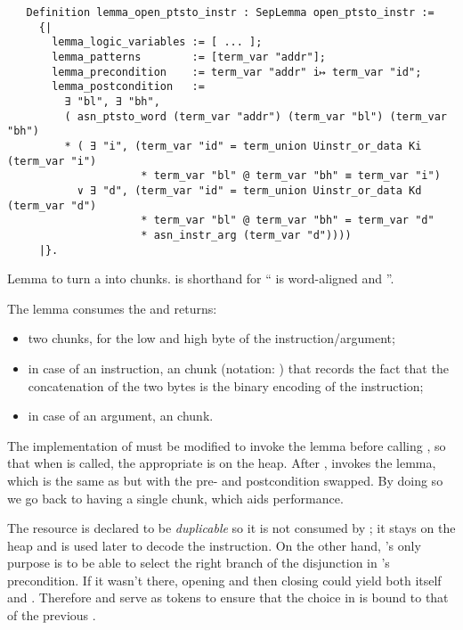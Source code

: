 \begin{listing}[h]
  \begin{verbatim}
   Definition lemma_open_ptsto_instr : SepLemma open_ptsto_instr :=
     {|
       lemma_logic_variables := [ ... ];
       lemma_patterns        := [term_var "addr"];
       lemma_precondition    := term_var "addr" i↦ term_var "id";
       lemma_postcondition   :=
         ∃ "bl", ∃ "bh",
         ( asn_ptsto_word (term_var "addr") (term_var "bl") (term_var "bh")
         * ( ∃ "i", (term_var "id" = term_union Uinstr_or_data Ki (term_var "i")
                     * term_var "bl" @ term_var "bh" ≡ term_var "i")
           ∨ ∃ "d", (term_var "id" = term_union Uinstr_or_data Kd (term_var "d")
                     * term_var "bl" @ term_var "bh" = term_var "d"
                     * asn_instr_arg (term_var "d"))))
     |}.
  \end{verbatim}
  \caption{Lemma to turn a  into  chunks.  is shorthand for `` is word-aligned and ''.}
  \label{lst:open_ptsto_instr}
\end{listing}

\noindent
The lemma consumes the  and returns:
\begin{itemize}
\item two  chunks, for the low and high byte of the instruction/argument;
\item in case of an instruction, an  chunk (notation: ) that records the fact that the concatenation of the two bytes is the binary encoding of the instruction;
\item in case of an argument, an  chunk.
\end{itemize}

The \usail implementation of  must be modified to invoke the lemma before calling , so that when  is called, the appropriate  is on the heap. After ,  invokes the  lemma, which is the same as  but with the pre- and postcondition swapped. By doing so we go back to having a single  chunk, which aids performance.

The  resource is declared to be \emph{duplicable} so it is not consumed by ; it stays on the heap and is used later to decode the instruction. On the other hand, 's only purpose is to be able to select the right branch of the disjunction in 's precondition. If it wasn't there, opening and then closing  could yield both  itself and . Therefore  and  serve as tokens to ensure that the choice in  is bound to that of the previous .

